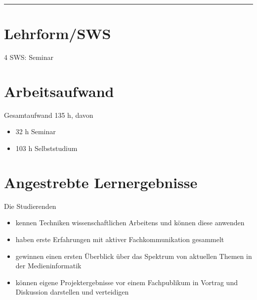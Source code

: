 \begin{center}\rule{0.5\linewidth}{0.5pt}\end{center}

\hypertarget{lehrformswspathlabel....srcmodulbeschreibungen-bachelor-bpo5ba_praxisprojektseminar}{%
\section*{Lehrform/SWS\label{../../src/modulbeschreibungen-bachelor-bpo5/BA_Praxisprojektseminar}}\label{lehrformswspathlabel....srcmodulbeschreibungen-bachelor-bpo5ba_praxisprojektseminar}}

4 SWS: Seminar

\hypertarget{arbeitsaufwandpathlabel....srcmodulbeschreibungen-bachelor-bpo5ba_praxisprojektseminar}{%
\section*{Arbeitsaufwand\label{../../src/modulbeschreibungen-bachelor-bpo5/BA_Praxisprojektseminar}}\label{arbeitsaufwandpathlabel....srcmodulbeschreibungen-bachelor-bpo5ba_praxisprojektseminar}}

Gesamtaufwand 135 h, davon

\begin{itemize}
\tightlist
\item
  32 h Seminar
\item
  103 h Selbststudium
\end{itemize}

\hypertarget{angestrebte-lernergebnissepathlabel....srcmodulbeschreibungen-bachelor-bpo5ba_praxisprojektseminar}{%
\section*{Angestrebte
Lernergebnisse\label{../../src/modulbeschreibungen-bachelor-bpo5/BA_Praxisprojektseminar}}\label{angestrebte-lernergebnissepathlabel....srcmodulbeschreibungen-bachelor-bpo5ba_praxisprojektseminar}}

Die Studierenden

\begin{itemize}
\tightlist
\item
  kennen Techniken wissenschaftlichen Arbeitens und können diese
  anwenden
\item
  haben erste Erfahrungen mit aktiver Fachkommunikation gesammelt
\item
  gewinnen einen ersten Überblick über das Spektrum von aktuellen Themen
  in der Medieninformatik
\item
  können eigene Projektergebnisse vor einem Fachpublikum in Vortrag und
  Diskussion darstellen und verteidigen
\end{itemize}

